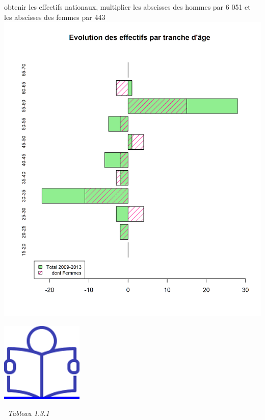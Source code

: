 obtenir les effectifs nationaux, multiplier les abscisses des hommes par
6 051 et les abscisses des femmes par 443\newpage
\includegraphics{altair_files/figure-latex/unnamed-chunk-17-3.png}

\href{../Docs/Notices/fiche_3.odt}{\includegraphics{icones/Notice.png}}

\newpage

~\emph{Tableau 1.3.1}

